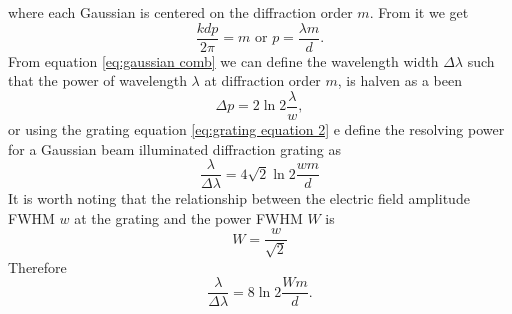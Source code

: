 \documentclass[12pt,twoside,english]{book}
\renewcommand{\~}{\perispomeni}%
\numberwithin{equation}{section}
\numberwithin{figure}{section}
\begin{document}
where each Gaussian is centered on the diffraction order $m$. From it we get
\begin{equation}
\frac{kdp}{2\pi}=m\mbox{ or }p=\frac{\lambda m}{d}.\label{eq:grating equation 2}
\end{equation}
From equation \ref{eq:gaussian comb} we can define the wavelength width $\Delta\lambda$ such that the power of wavelength $\lambda$ at diffraction order $m$, is halven as a been
\begin{equation}
\Delta p=2\ln2\frac{\lambda}{w},
\end{equation}
or using the grating equation \ref{eq:grating equation 2} e define the resolving power for a Gaussian beam illuminated diffraction grating as
\begin{equation}
\frac{\lambda}{\Delta\lambda}=4\sqrt{2}\ln2\frac{wm}{d}\label{eq:resolving power gaussian}\end{equation}
It is worth noting that the relationship between the electric field amplitude \gls{FWHM} $w$ at the grating and the power \gls{FWHM} $W$ is
\begin{equation}
W=\frac{w}{\sqrt{2}}
\end{equation}
Therefore
\begin{equation}
\frac{\lambda}{\Delta\lambda}=8\ln2\frac{Wm}{d}.
\end{equation}
%
\end{document}
